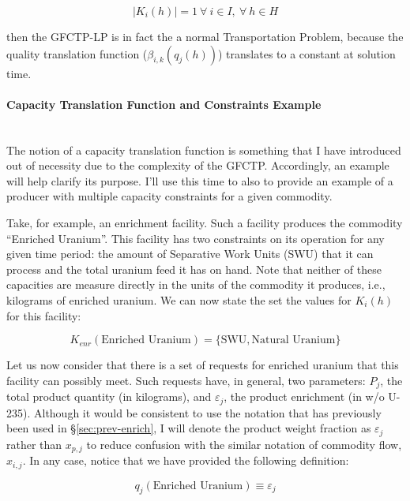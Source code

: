 \begin{equation}\label{eqs:1constraint}
  \left|{K_{i}(h)}\right| = 1 \: \forall \: i \in I, \: \forall \: h \in H
\end{equation}

then the GFCTP-LP is in fact the a normal Transportation Problem, because the
quality translation function ($\beta_{i,k}(q_{j}(h))$) translates to a constant
at solution time.

\paragraph{Capacity Translation Function and Constraints Example}~\\

The notion of a capacity translation function is something that I have
introduced out of necessity due to the complexity of the GFCTP. Accordingly, an
example will help clarify its purpose. I'll use this time to also to provide an
example of a producer with multiple capacity constraints for a given commodity.

Take, for example, an enrichment facility. Such a facility produces the
commodity ``Enriched Uranium''. This facility has two constraints on its
operation for any given time period: the amount of Separative Work Units (SWU)
that it can process and the total uranium feed it has on hand. Note that neither
of these capacities are measure directly in the units of the commodity it
produces, i.e., kilograms of enriched uranium. We can now state the set the
values for $K_{i}(h)$ for this facility:

\begin{equation}\label{eqs:enr-constr-commods}
  K_{enr}(\mbox{Enriched Uranium}) = \{ \mbox{SWU}, \mbox{Natural Uranium} \}
\end{equation}

Let us now consider that there is a set of requests for enriched uranium that
this facility can possibly meet. Such requests have, in general, two parameters:
$P_{j}$, the total product quantity (in kilograms), and $\varepsilon_{j}$, the
product enrichment (in w/o U-235). Although it would be consistent to use the
notation that has previously been used in \S\ref{sec:prev-enrich}, I will denote
the product weight fraction as $\varepsilon_{j}$ rather than $x_{p,j}$ to reduce
confusion with the similar notation of commodity flow, $x_{i,j}$. In any case,
notice that we have provided the following definition:

\begin{equation}\label{eqs:enr-q-swu}
  q_{j}(\mbox{Enriched Uranium}) \equiv \varepsilon_{j}
\end{equation}

